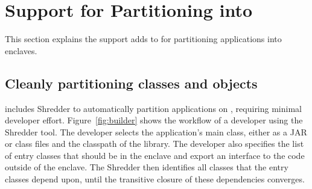 \section{\java{} Support for Partitioning into \sgx{}}
\label{sec:concept}

This section explains the support \systemname{} adds to \java{}
for partitioning applications into \sgx{} enclaves.

\subsection{Cleanly partitioning classes and objects}
\label{sec:concept:partition}


\systemname{} includes Shredder to automatically partition \java{} applications on \sgx{},
requiring  minimal developer effort.
Figure~\ref{fig:builder} shows the workflow of a developer using the \systemname{} Shredder tool.
The developer selects the application's main class, either as a JAR or class files
and the classpath of the library.
The developer also specifies the list of
entry classes that should be in the enclave and export an interface to the code 
outside of the enclave.
The Shredder then
identifies all classes that the entry classes depend upon,
until the transitive closure of these dependencies converges.


